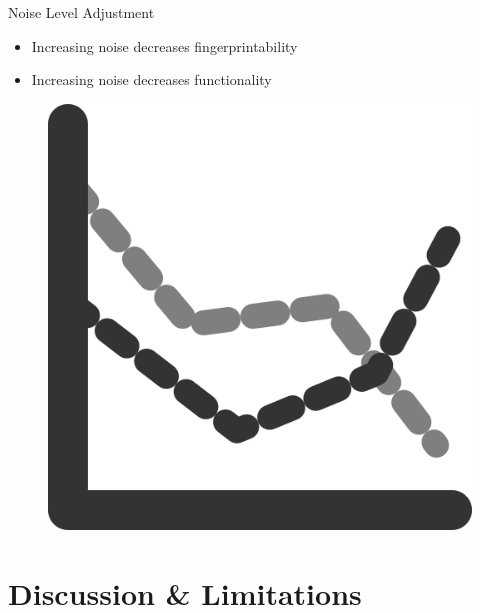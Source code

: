 \documentclass[aspectratio=169]{beamer}
[aspectratio=169] %
\begin{document}

\begin{frame}{Noise Level Adjustment}
  \begin{minipage}{0.49\textwidth} 
    \begin{itemize}
      \item Increasing noise decreases fingerprintability
      \item Increasing noise decreases functionality
    \end{itemize}
  \end{minipage}
  \hfill
  \begin{minipage}{0.49\textwidth} 
    \begin{figure}
      \centering
      \includegraphics[height=0.5\textheight]{figures/graph.png}
    \end{figure}
  \end{minipage}
\end{frame}


\section{Discussion \& Limitations}
\end{document}
